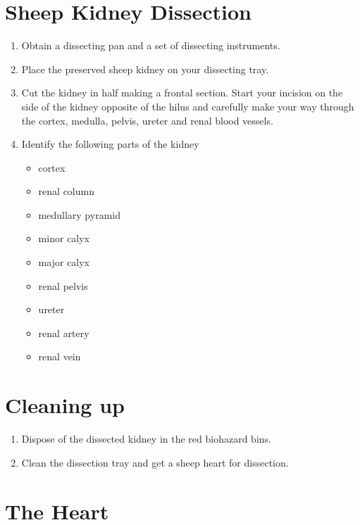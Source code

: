 \section{Sheep Kidney Dissection}\label{sheep-kidney-dissection}

\begin{enumerate}
\def\labelenumi{\arabic{enumi}.}
\tightlist
\item
  Obtain a dissecting pan and a set of dissecting instruments.
\item
  Place the preserved sheep kidney on your dissecting tray.
\item
  Cut the kidney in half making a frontal section. Start your incision
  on the side of the kidney opposite of the hilus and carefully make
  your way through the cortex, medulla, pelvis, ureter and renal blood
  vessels.
\item
  Identify the following parts of the kidney

  \begin{itemize}
  \tightlist
  \item
    cortex
  \item
    renal column
  \item
    medullary pyramid
  \item
    minor calyx
  \item
    major calyx
  \item
    renal pelvis
  \item
    ureter
  \item
    renal artery
  \item
    renal vein
  \end{itemize}
\end{enumerate}

\section{Cleaning up}\label{cleaning-up-4}

\begin{enumerate}
\def\labelenumi{\arabic{enumi}.}
\tightlist
\item
  Dispose of the dissected kidney in the red biohazard bins.
\item
  Clean the dissection tray and get a sheep heart for dissection.
\end{enumerate}

\section{The Heart}\label{the-heart}


